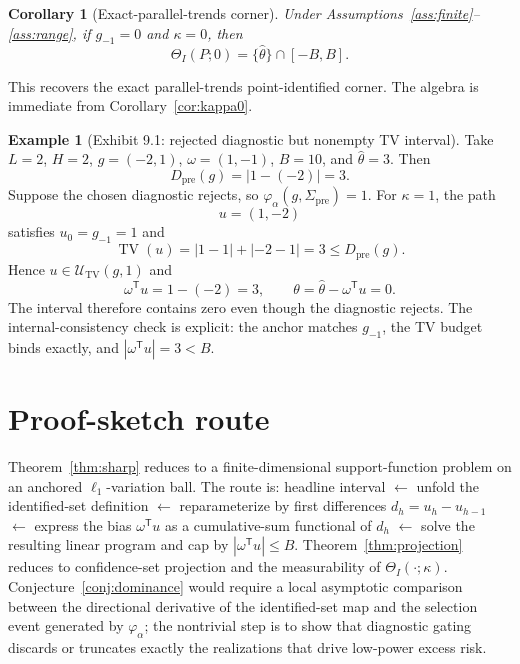 \documentclass[11pt]{article}
\newcommand{\transpose}{\mathsf{T}}
\theoremstyle{definition}
\newtheorem{example}{Example}
\theoremstyle{plain}
\newtheorem{corollary}{Corollary}
\theoremstyle{remark}
\begin{document}
\begin{corollary}[Exact-parallel-trends corner]\label{cor:parallel}
Under Assumptions~\ref{ass:finite}--\ref{ass:range}, if \(g_{-1}=0\) and \(\kappa=0\), then
\[
\Theta_I(P;0)=\{\hat\theta\}\cap[-B,B].
\]
\end{corollary}

This recovers the exact parallel-trends point-identified corner. The algebra is immediate from Corollary~\ref{cor:kappa0}.

\begin{example}[Exhibit 9.1: rejected diagnostic but nonempty TV interval]\label{ex:reject}
Take \(L=2\), \(H=2\), \(g=(-2,1)\), \(\omega=(1,-1)\), \(B=10\), and \(\hat\theta=3\). Then
\[
D_{\mathrm{pre}}(g)=|1-(-2)|=3.
\]
Suppose the chosen diagnostic rejects, so \(\varphi_\alpha(g,\Sigma_{\mathrm{pre}})=1\). For \(\kappa=1\), the path
\[
u=(1,-2)
\]
satisfies \(u_0=g_{-1}=1\) and
\[
\operatorname{TV}(u)=|1-1|+|-2-1|=3\le D_{\mathrm{pre}}(g).
\]
Hence \(u\in\mathcal U_{\mathrm{TV}}(g,1)\) and
\[
\omega^\transpose u=1-(-2)=3,
\qquad
\theta=\hat\theta-\omega^\transpose u=0.
\]
The interval therefore contains zero even though the diagnostic rejects. The internal-consistency check is explicit: the anchor matches \(g_{-1}\), the TV budget binds exactly, and \(|\omega^\transpose u|=3<B\).
\end{example}

\section{Proof-sketch route}
Theorem~\ref{thm:sharp} reduces to a finite-dimensional support-function problem on an anchored \(\ell_1\)-variation ball. The route is: headline interval \(\leftarrow\) unfold the identified-set definition \(\leftarrow\) reparameterize by first differences \(d_h=u_h-u_{h-1}\) \(\leftarrow\) express the bias \(\omega^\transpose u\) as a cumulative-sum functional of \(d_h\) \(\leftarrow\) solve the resulting linear program and cap by \(|\omega^\transpose u|\le B\). Theorem~\ref{thm:projection} reduces to confidence-set projection and the measurability of \(\Theta_I(\cdot;\kappa)\). Conjecture~\ref{conj:dominance} would require a local asymptotic comparison between the directional derivative of the identified-set map and the selection event generated by \(\varphi_\alpha\); the nontrivial step is to show that diagnostic gating discards or truncates exactly the realizations that drive low-power excess risk.
\end{document}
